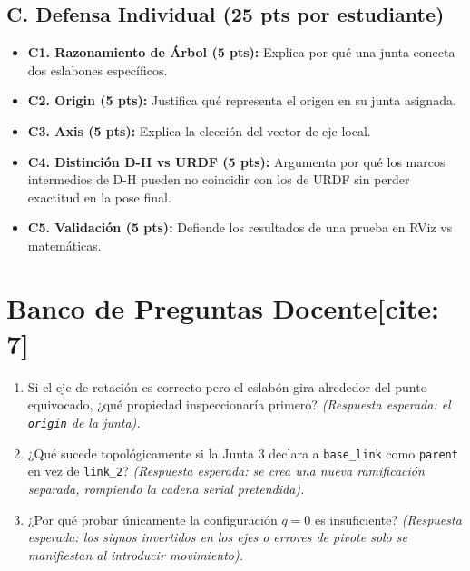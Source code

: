 \documentclass[11pt, a4paper]{article}
\begin{document}
\subsection*{C. Defensa Individual (25 pts por estudiante)}
\begin{itemize}
    \item \textbf{C1. Razonamiento de Árbol (5 pts):} Explica por qué una junta conecta dos eslabones específicos.
    \item \textbf{C2. Origin (5 pts):} Justifica qué representa el origen en su junta asignada.
    \item \textbf{C3. Axis (5 pts):} Explica la elección del vector de eje local.
    \item \textbf{C4. Distinción D-H vs URDF (5 pts):} Argumenta por qué los marcos intermedios de D-H pueden no coincidir con los de URDF sin perder exactitud en la pose final.
    \item \textbf{C5. Validación (5 pts):} Defiende los resultados de una prueba en RViz vs matemáticas.
\end{itemize}

\section*{Banco de Preguntas Docente[cite: 7]}
\begin{enumerate}
    \item Si el eje de rotación es correcto pero el eslabón gira alrededor del punto equivocado, ¿qué propiedad inspeccionaría primero? \textit{(Respuesta esperada: el \texttt{origin} de la junta).}
    \item ¿Qué sucede topológicamente si la Junta 3 declara a \texttt{base\_link} como \texttt{parent} en vez de \texttt{link\_2}? \textit{(Respuesta esperada: se crea una nueva ramificación separada, rompiendo la cadena serial pretendida).}
    \item ¿Por qué probar únicamente la configuración $q=0$ es insuficiente? \textit{(Respuesta esperada: los signos invertidos en los ejes o errores de pivote solo se manifiestan al introducir movimiento).}
\end{enumerate}
\end{document}

